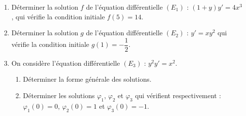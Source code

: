 
\begin{exercice}\label{exoautoanalyseCTU-32}


\begin{enumerate}
\item Déterminer la solution $f$ de l'équation différentielle $(E_{1})$ : $(1+y)y'=4x^3$, qui vérifie  la condition initiale $f(5)=14$.
\item Déterminer la solution $g$ de l'équation différentielle $(E_{2})$ :  $y'=xy^2$ qui vérifie  la condition initiale $g(1)=-\dfrac{1}{2}$.
\item On considère l'équation différentielle $(E_{3})$ : $y^2y'=x^2$. 
\begin{enumerate}
\item Déterminer la forme générale des solutions.
\item
Déterminer les solutions $\varphi_{1}$, $\varphi_{2}$ et $\varphi_{3}$ qui vérifient respectivement : $\varphi_{1}(0)=0$, $\varphi_{2}(0)=1$ et $\varphi_{3}(0)=-1$. 
 \end{enumerate}
\end{enumerate}




\end{exercice}
